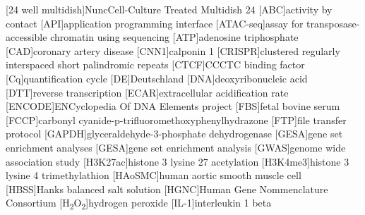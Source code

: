 \begin{acronym}
[24 well multidish]{Nunc\texttrademark Cell-Culture Treated Multidish 24}
                                                   [ABC]{activity by contact}
                                     [API]{application programming interface}
     [ATAC-seq]{assay for transposase-accessible chromatin using sequencing}
                                                [ATP]{adenosine triphosphate}
                                               [CAD]{coronary artery disease}
                                                          [CNN1]{calponin 1}
       [CRISPR]{clustered regularly interspaced short palindromic repeats}
                                                [CTCF]{CCCTC binding factor}
                                                    [Cq]{quantification cycle}
                                                             [DE]{Deutschland}
                                                 [DNA]{deoxyribonucleic acid}
                                                 [DTT]{reverse transcription}
                                    [ECAR]{extracellular acidification rate}
                            [ENCODE]{ENCyclopedia Of DNA Elements project}
                                                    [FBS]{fetal bovine serum}
                  [FCCP]{carbonyl cyanide-p-trifluoromethoxyphenylhydrazone}
                                                [FTP]{file transfer protocol}
                          [GAPDH]{glyceraldehyde-3-phosphate dehydrogenase}
                                  [GESA]{gene set enrichment analyses}
                                        [GESA]{gene set enrichment analysis}
                                       [GWAS]{genome wide association study}
                               [H3K27ac]{histone 3 lysine 27 acetylation}
                            [H3K4me3]{histone 3 lysine 4 trimethylathion}
                                 [HAoSMC]{human aortic smooth muscle cell}
                                        [HBSS]{Hanks balanced salt solution}
                                 [HGNC]{Human Gene Nommenclature Consortium}
                   [H\textsubscript{2}O\textsubscript{2}]{hydrogen peroxide}
                                              [IL-1\beta]{interleukin 1 beta}

\end{acronym}
